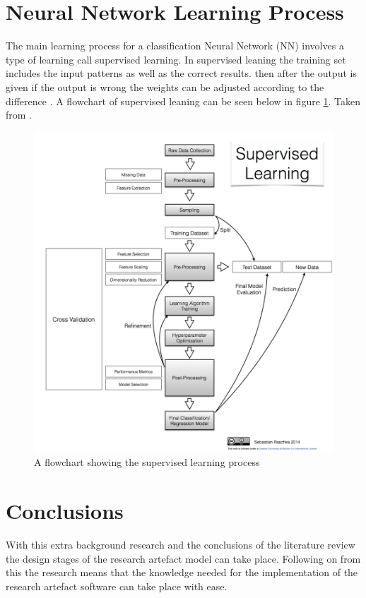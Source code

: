 \section{Neural Network Learning Process}
The main learning process for a classification Neural Network (NN) involves a type of learning call supervised learning. In supervised leaning the training set includes the input patterns as well as the correct results. then after the output is given if the output is wrong the weights can be adjusted according to the difference \cite{kriesel}. A flowchart of supervised leaning can be seen below in figure \ref{fig:slfc}. Taken from \cite{seb}. 
\begin{figure}[h!]
  \centering
  \includegraphics[width = (\textwidth)/2]{supervisedlearningflowchart.png}
  \caption{A flowchart showing the supervised learning process}
  \label{fig:slfc}
\end{figure}

\section{Conclusions}

With this extra background research and the conclusions of the literature review the design stages of the research artefact model can take place. Following on from this the research means that the knowledge needed for the implementation of the research artefact software can take place with ease. 




